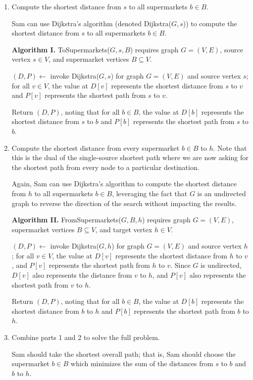 \begin{enumerate}
\item Compute the shortest distance from $s$ to all supermarkets $b \in B$.
\begin{solution}
Sam can use Dijkstra's algorithm (denoted {\sc Dijkstra}($G,s$)) to compute the shortest distance from $s$ to all supermarkets $b\in B$.

\textbf{Algorithm I. }{\sc ToSupermarkets}($G,s,B$) requires graph $G=(V,E)$, source vertex $s\in V$, and supermarket vertices $B\subseteq V$.

$(D,P)\leftarrow$ invoke {\sc Dijkstra}($G,s$) for graph $G=(V,E)$ and source vertex $s$; for all $v\in V$, the value at $D[v]$ represents the shortest distance from $s$ to $v$ and $P[v]$ represents the shortest path from $s$ to $v$.

Return $(D,P)$, noting that for all $b\in B$, the value at $D[b]$ represents the shortest distance from $s$ to $b$ and $P[b]$ represents the shortest path from $s$ to $b$.
\end{solution}
\item Compute the shortest distance from every supermarket $b \in B$ to $h$. Note that this is the dual of the single-source shortest path where we are now asking for the shortest path from every node to a particular destination.
\begin{solution}
Again, Sam can use Dijkstra's algorithm to compute the shortest distance from $h$ to all supermarkets $b\in B$, leveraging the fact that $G$ is an undirected graph to reverse the direction of the search without impacting the results.

\textbf{Algorithm II. }{\sc FromSupermarkets}($G,B,h$) requires graph $G=(V,E)$, supermarket vertices $B\subseteq V$, and target vertex $h\in V$.

$(D,P)\leftarrow $ invoke {\sc Dijkstra}($G,h$) for graph $G=(V,E)$ and source vertex $h$; for all $v\in V$, the value at $D[v]$ represents the shortest distance from $h$ to $v$, and $P[v]$ represents the shortest path from $h$ to $v$. Since $G$ is undirected, $D[v]$ also represents the distance from $v$ to $h$, and $P[v]$ also represents the shortest path from $v$ to $h$.

Return $(D,P)$, noting that for all $b\in B$, the value at $D[b]$ represents the shortest distance from $b$ to $h$ and $P[b]$ represents the shortest path from $b$ to $h$.
\end{solution}
\newpage
\item Combine parts 1 and 2 to solve the full problem.
\begin{solution}
Sam should take the shortest overall path; that is, Sam should choose the supermarket $b\in B$ which minimizes the sum of the distances from $s$ to $b$ and $b$ to $h$.


\end{solution}
\end{enumerate}
